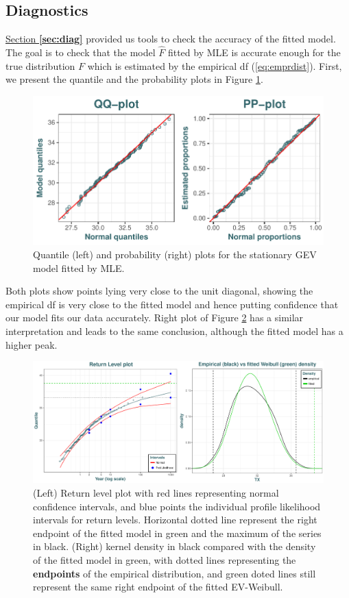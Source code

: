 \subsection{Diagnostics}

\hyperref[sec:diag]{Section \textbf{\ref{sec:diag}}} provided us tools to check the accuracy of the fitted model. The goal is to check that the
model $\hat{F}$ fitted by MLE is accurate enough for the true distribution $F$ which is estimated by the empirical df
(\ref{eq:emprdist}). First, we present the quantile and the probability plots in Figure \ref{fig:ppqqplot}.

\begin{figure}[!htb]
	\centering	\includegraphics[width=.7\linewidth]{pp_qqplot.pdf}\caption{Quantile (left) and probability (right) plots for the stationary GEV model fitted by MLE.}\label{fig:ppqqplot}
\end{figure}

Both plots show points lying very close to the unit diagonal, showing the empirical df is very close to the fitted model and hence putting confidence that our model fits our data accurately.
Right plot of Figure \ref{fig:rl_empdes} has a similar interpretation and leads to the same conclusion, although the fitted model has a higher peak.

\begin{figure}[!htb]
	\centering	\includegraphics[width=.75\linewidth]{rl_empdes.pdf}\caption{(Left) Return level plot with red lines representing normal confidence intervals, and blue points the individual profile likelihood intervals for return levels. Horizontal dotted line represent the right endpoint of the	fitted model in green and the maximum of the series in black. (Right) kernel density in black compared with the density of the fitted model in green, with dotted lines representing the \textbf{endpoints} of the empirical distribution, and green doted lines still represent the same right endpoint of the fitted EV-Weibull.}\label{fig:rl_empdes}
\end{figure}


